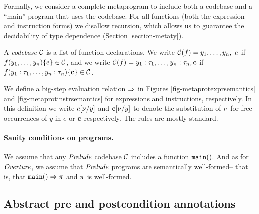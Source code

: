 Formally, we consider a complete metaprogram to include
both a codebase and a ``main'' program that uses the codebase.
For all functions (both the expression and instruction forms) we disallow
recursion, which allows us to guarantee the decidability
of type dependence (Section \ref{section-metaty}).
\begin{definition}
A \emph{codebase} $\mathcal{C}$ is a list of function 
declarations. We write $ \mathcal{C}(f) = y_1,\ldots,y_n,\ e$
if $f(y_1,\ldots,y_n) \{ e \} \in \mathcal{C}$, and we
write  $ \mathcal{C}(f) = y_1 : \tau_1, \ldots, y_n : \tau_n, \mathbf{c}$
if $f(y_1 : \tau_1, \ldots, y_n : \tau_n) \{ \mathbf{c} \} \in \mathcal{C}$.
\end{definition}

\metaprotexprsemanticsfig

We define a big-step evaluation relation $\Rightarrow$ in Figures
\ref{fig-metaprotexprsemantics} and \ref{fig-metaprotinstrsemantics}
for expressions and instructions, respectively.  In this definition we
write $e[\nu/y]$ and $\mathbf{c}[\nu/y]$ to denote the substitution of
$\nu$ for free occurrences of $y$ in $e$ or $\mathbf{c}$ respectively. The
rules are mostly standard.


\paragraph{Sanity conditions on programs.} We assume that
any $\mathit{Prelude}$ codebase $\mathcal{C}$ includes a function
$\texttt{main}()$. And as for $\mathit{Overture}$, we assume that $\mathit{Prelude}$
programs are semantically well-formed-- that is, that
$\texttt{main}() \Rightarrow \pi$ and $\pi$ is well-formed.

\metaprotinstrsemanticsfig

\subsection{Abstract pre and postcondition annotations}

